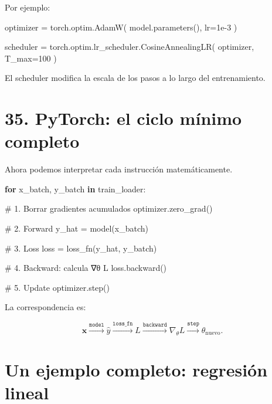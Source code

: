 \documentclass[
  letterpaper,
  DIV=11,
  numbers=noendperiod]{scrartcl}
\newenvironment{Shaded}{\begin{snugshade}}{\end{snugshade}}
\newcommand{\CommentTok}[1]{\textcolor[rgb]{0.37,0.37,0.37}{#1}}
\newcommand{\ControlFlowTok}[1]{\textcolor[rgb]{0.00,0.23,0.31}{\textbf{#1}}}
\newcommand{\DecValTok}[1]{\textcolor[rgb]{0.68,0.00,0.00}{#1}}
\newcommand{\FloatTok}[1]{\textcolor[rgb]{0.68,0.00,0.00}{#1}}
\newcommand{\KeywordTok}[1]{\textcolor[rgb]{0.00,0.23,0.31}{\textbf{#1}}}
\newcommand{\NormalTok}[1]{\textcolor[rgb]{0.00,0.23,0.31}{#1}}
\newcommand{\OperatorTok}[1]{\textcolor[rgb]{0.37,0.37,0.37}{#1}}
\begin{document}
Por ejemplo:

\begin{Shaded}
\begin{Highlighting}[]
\NormalTok{optimizer }\OperatorTok{=}\NormalTok{ torch.optim.AdamW(}
\NormalTok{    model.parameters(),}
\NormalTok{    lr}\OperatorTok{=}\FloatTok{1e{-}3}
\NormalTok{)}

\NormalTok{scheduler }\OperatorTok{=}\NormalTok{ torch.optim.lr\_scheduler.CosineAnnealingLR(}
\NormalTok{    optimizer,}
\NormalTok{    T\_max}\OperatorTok{=}\DecValTok{100}
\NormalTok{)}
\end{Highlighting}
\end{Shaded}

El scheduler modifica la escala de los pasos a lo largo del
entrenamiento.

\section{35. PyTorch: el ciclo mínimo
completo}\label{pytorch-el-ciclo-muxednimo-completo}

Ahora podemos interpretar cada instrucción matemáticamente.

\begin{Shaded}
\begin{Highlighting}[]
\ControlFlowTok{for}\NormalTok{ x\_batch, y\_batch }\KeywordTok{in}\NormalTok{ train\_loader:}

    \CommentTok{\# 1. Borrar gradientes acumulados}
\NormalTok{    optimizer.zero\_grad()}

    \CommentTok{\# 2. Forward}
\NormalTok{    y\_hat }\OperatorTok{=}\NormalTok{ model(x\_batch)}

    \CommentTok{\# 3. Loss}
\NormalTok{    loss }\OperatorTok{=}\NormalTok{ loss\_fn(y\_hat, y\_batch)}

    \CommentTok{\# 4. Backward: calcula ∇θ L}
\NormalTok{    loss.backward()}

    \CommentTok{\# 5. Update}
\NormalTok{    optimizer.step()}
\end{Highlighting}
\end{Shaded}

La correspondencia es:

\[
\mathbf x
\overset{\texttt{model}}{\longrightarrow}
\hat y
\overset{\texttt{loss\_fn}}{\longrightarrow}
L
\overset{\texttt{backward}}{\longrightarrow}
\nabla_\theta L
\overset{\texttt{step}}{\longrightarrow}
\theta_{\mathrm{nuevo}}.
\]

\section{Un ejemplo completo: regresión
lineal}\label{un-ejemplo-completo-regresiuxf3n-lineal}
\end{document}
